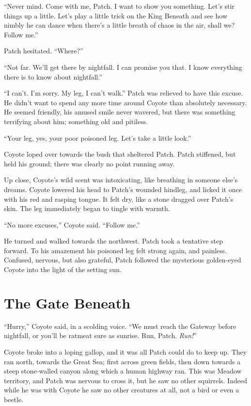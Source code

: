 \documentclass[ebook,oneside,openany,17pt]{memoir}
\newenvironment{tolerant}[1]{%
  \par\tolerance=#1\relax
}{%
  \par
}
\renewcommand{\thechapter}{\Roman{chapter}}
\newcounter{sections}
\newcommand{\sections}[1]{%
  \section*{#1}
  \addtocounter{sections}{1}%
  \pdfbookmark[1]{#1}{section.\thechapter.\thesections}}
\begin{document}
“Never mind. Come with me, Patch. I want to show you something. Let’s
stir things up a little. Let’s play a little trick on the King Beneath
and see how nimbly he can dance when there’s a little breath of chaos
in the air, shall we? Follow me.”

Patch hesitated. “Where?”

\begin{tolerant}{500}
“Not far. We’ll get there by nightfall. I can promise you that. I know
everything there is to know about nightfall.”
\end{tolerant}

“I can’t. I’m sorry. My leg, I can’t walk.” Patch was relieved to have
this excuse. He didn’t want to spend any more time around Coyote than
absolutely necessary. He seemed friendly, his amused smile never
wavered, but there was something terrifying about him; something old
and pitiless.

“Your leg, yes, your poor poisoned leg. Let’s take a little look.”

Coyote loped over towards the bush that sheltered Patch. Patch
stiffened, but held his ground; there was clearly no point running
away.

Up close, Coyote’s wild scent was intoxicating, like breathing in
someone else’s dreams. Coyote lowered his head to Patch’s wounded
hindleg, and licked it once with his red and rasping tongue. It felt
dry, like a stone dragged over Patch’s skin. The leg immediately began
to tingle with warmth.

“No more excuses,” Coyote said. “Follow me.”

He turned and walked towards the northwest. Patch took a tentative
step forward. To his amazement his poisoned leg felt strong again, and
painless. Confused, nervous, but also grateful, Patch followed the
mysterious golden-eyed Coyote into the light of the setting sun.


\sections{The Gate Beneath}

“Hurry,” Coyote said, in a scolding voice. “We must reach the Gateway
before nightfall, or you’ll be ratmeat sure as sunrise. Run,
Patch. \emph{Run!}”

Coyote broke into a loping gallop, and it was all Patch could do to
keep up. They ran north, towards the Great Sea; first across green
fields, then down towards a steep stone-walled canyon along which a
human highway ran. This was Meadow territory, and Patch was nervous to
cross it, but he saw no other squirrels. Indeed while he was with
Coyote he saw no other creatures at all, not a bird or even a beetle.
\end{document}
